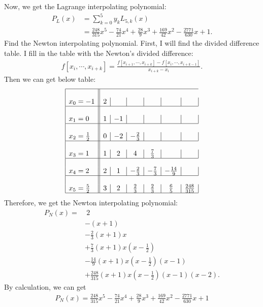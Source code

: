 \documentclass{article}
\begin{document}
\begin{enumerate}
    Now, we get the Lagrange interpolating polynomial:
    \begin{align}
        P_L(x) & = \sum_{k=0}^{5} y_k L_{5, k}(x) \nonumber
        \\
        & = \frac{248}{315}x^5 - \frac{74}{21}x^4 + \frac{28}{9}x^3 + \frac{169}{42}x^2 - \frac{2771}{630}x + 1.
    \end{align}
    Find the Newton interpolating polynomial. First, I will find the divided difference table. I fill in the table with the Newton's divided difference:
    \begin{align}
        f[x_i, \cdots, x_{i+k}]
        = \frac{f[x_{i+1}, \cdots, x_{i+k}] - f[x_{i}, \cdots, x_{i+k-1}]}{x_{i+k} - x_i}.
    \end{align}
    Then we can get below table:
    \begin{align}
        \begin{array}{|l||c|c|c|c|c|c|} 
            \hline\\ 
            x_0=-1 & 2 & & & & & \\ 
            \hline  \\
            x_1=0 & 1 & -1 & & & & \\
            \hline \\ 
            x_2=\frac{1}{2} & 0 & -2 & -\frac{2}{3} & & & \\ 
            \hline \\
            x_3 = 1 & 1 & 2 & 4 & \frac{7}{3} & & \\
            \hline \\
            x_4 = 2 & 2 & 1 & -\frac{2}{3} & -\frac{7}{3} & -\frac{14}{9} & \\
            \hline \\
            x_5 = \frac{5}{2} & 3 & 2 & \frac{2}{3} & \frac{2}{3} & \frac{6}{5} & \frac{248}{315}\\
            \hline
        \end{array}
    \end{align}
    Therefore, we get the Newton interpolating polynomial:
    \begin{align}
        P_N(x) = & \ 2 \nonumber
        \\ & -(x+1) \nonumber
        \\ & - \frac{2}{3}(x+1)x \nonumber
        \\ & + \frac{7}{3}(x+1)x(x-\frac{1}{2}) \nonumber
        \\ & - \frac{14}{9}(x+1)x(x-\frac{1}{2})(x-1) \nonumber
        \\ & + \frac{248}{315}(x+1)x(x-\frac{1}{2})(x-1)(x-2).
    \end{align}
    By calculation, we can get
    \begin{align}
        P_N(x) = \frac{248}{315}x^5-\frac{74}{21}x^4+\frac{28}{9}x^3+\frac{169}{42}x^2-\frac{2771}{630}x+1
    \end{align}


\end{enumerate}
\end{document}
